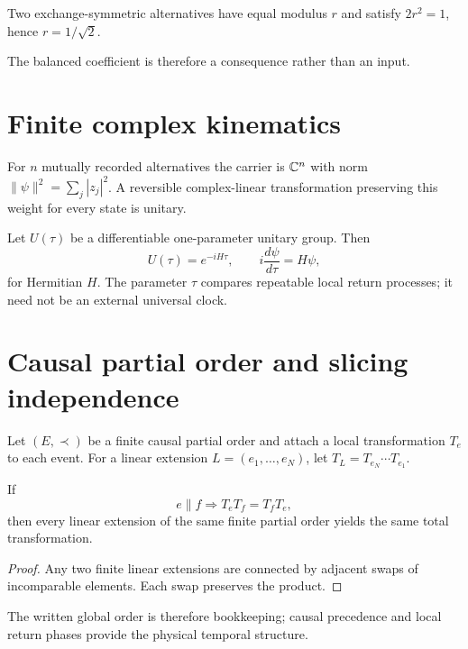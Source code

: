 \documentclass[11pt,a4paper]{article}
\begin{document}
\begin{corollary}
Two exchange-symmetric alternatives have equal modulus $r$ and satisfy $2r^2=1$, hence $r=1/\sqrt2$.
\end{corollary}
The balanced coefficient is therefore a consequence rather than an input.

\section{Finite complex kinematics}
For $n$ mutually recorded alternatives the carrier is $\mathbb{C}^n$ with norm $\|\psi\|^2=\sum_j|z_j|^2$. A reversible complex-linear transformation preserving this weight for every state is unitary.

Let $U(\tau)$ be a differentiable one-parameter unitary group. Then
\begin{equation}
U(\tau)=e^{-iH\tau},\qquad i\frac{d\psi}{d\tau}=H\psi,
\end{equation}
for Hermitian $H$. The parameter $\tau$ compares repeatable local return processes; it need not be an external universal clock.

\section{Causal partial order and slicing independence}
Let $(E,\prec)$ be a finite causal partial order and attach a local transformation $T_e$ to each event. For a linear extension $L=(e_1,\ldots,e_N)$, let $T_L=T_{e_N}\cdots T_{e_1}$.
\begin{theorem}
If
\begin{equation}
e\parallel f\Longrightarrow T_eT_f=T_fT_e,
\end{equation}
then every linear extension of the same finite partial order yields the same total transformation.
\end{theorem}
\begin{proof}
Any two finite linear extensions are connected by adjacent swaps of incomparable elements. Each swap preserves the product.
\end{proof}
The written global order is therefore bookkeeping; causal precedence and local return phases provide the physical temporal structure.
\end{document}
